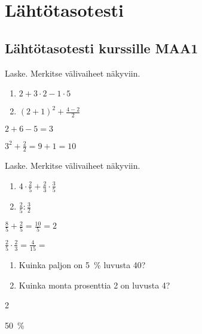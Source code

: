 \chapter{Lähtötasotesti}


\section*{Lähtötasotesti kurssille MAA1}

\begin{tehtava}
Laske. Merkitse välivaiheet näkyviin. 
\begin{enumerate}
\item $2+3\cdot 2-1\cdot5$
\item $(2+1)^2+\frac{4-2}{2}$
\end{enumerate}
\begin{vastaus}
\item $2+6-5=3$
\item $3^2+\frac{2}{2}=9+1=10$
\end{vastaus}
\end{tehtava}

\begin{tehtava}
Laske. Merkitse välivaiheet näkyviin. 
\begin{enumerate}
\item $4\cdot \frac{2}{5} + \frac{2}{3}\cdot \frac{3}{5}$
\item $\frac{2}{5} : \frac{3}{2}$
\end{enumerate}
\begin{vastaus}
\item $\frac{8}{5} + \frac{2}{5}=\frac{10}{5} = 2$
\item $\frac{2}{5} \cdot \frac{2}{3}=\frac{4}{15}=$
\end{vastaus}
\end{tehtava}

\begin{tehtava}
\begin{enumerate}
\item Kuinka paljon on 5~\% luvusta 40?
\item Kuinka monta prosenttia 2 on luvusta 4?
\end{enumerate}
\begin{vastaus}
\item 2
\item 50~\%
\end{vastaus}
\end{tehtava}

